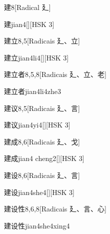 \begin{entry}{建}{8}[Radical ⼵]
  \begin{phonetics}{建}{jian4}[][HSK 3]
  \end{phonetics}
\end{entry}

\begin{entry}{建立}{8,5}[Radicais ⼵、⽴]
  \begin{phonetics}{建立}{jian4li4}[][HSK 3]
  \end{phonetics}
\end{entry}

\begin{entry}{建立者}{8,5,8}[Radicais ⼵、⽴、⽼]
  \begin{phonetics}{建立者}{jian4li4zhe3}
  \end{phonetics}
\end{entry}

\begin{entry}{建议}{8,5}[Radicais ⼵、⾔]
  \begin{phonetics}{建议}{jian4yi4}[][HSK 3]
  \end{phonetics}
\end{entry}

\begin{entry}{建成}{8,6}[Radicais ⼵、⼽]
  \begin{phonetics}{建成}{jian4 cheng2}[][HSK 3]
  \end{phonetics}
\end{entry}

\begin{entry}{建设}{8,6}[Radicais ⼵、⾔]
  \begin{phonetics}{建设}{jian4she4}[][HSK 3]
  \end{phonetics}
\end{entry}

\begin{entry}{建设性}{8,6,8}[Radicais ⼵、⾔、⼼]
  \begin{phonetics}{建设性}{jian4she4xing4}
  \end{phonetics}
\end{entry}

